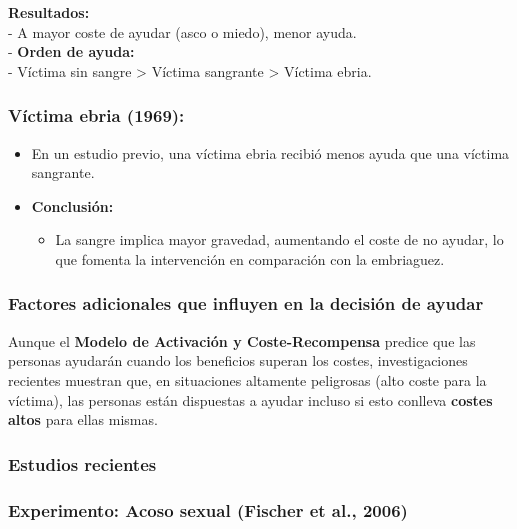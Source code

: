 \documentclass[
]{book}
\providecommand{\tightlist}{%
  \setlength{\itemsep}{0pt}\setlength{\parskip}{0pt}}
\begin{document}
\textbf{Resultados:}\\
- A mayor coste de ayudar (asco o miedo), menor ayuda.\\
- \textbf{Orden de ayuda:}\\
- Víctima sin sangre \textgreater{} Víctima sangrante \textgreater{} Víctima ebria.

\subsubsection{\texorpdfstring{\textbf{Víctima ebria (1969):}}{Víctima ebria (1969):}}\label{vuxedctima-ebria-1969}

\begin{itemize}
\tightlist
\item
  En un estudio previo, una víctima ebria recibió menos ayuda que una víctima sangrante.\\
\item
  \textbf{Conclusión:}

  \begin{itemize}
  \tightlist
  \item
    La sangre implica mayor gravedad, aumentando el coste de no ayudar, lo que fomenta la intervención en comparación con la embriaguez.
  \end{itemize}
\end{itemize}

\subsubsection{Factores adicionales que influyen en la decisión de ayudar}\label{factores-adicionales-que-influyen-en-la-decisiuxf3n-de-ayudar}

Aunque el \textbf{Modelo de Activación y Coste-Recompensa} predice que las personas ayudarán cuando los beneficios superan los costes, investigaciones recientes muestran que, en situaciones altamente peligrosas (alto coste para la víctima), las personas están dispuestas a ayudar incluso si esto conlleva \textbf{costes altos} para ellas mismas.

\subsubsection{\texorpdfstring{\textbf{Estudios recientes}}{Estudios recientes}}\label{estudios-recientes}

\subsubsection{\texorpdfstring{\textbf{Experimento: Acoso sexual (Fischer et al., 2006)}}{Experimento: Acoso sexual (Fischer et al., 2006)}}\label{experimento-acoso-sexual-fischer-et-al.-2006}
\end{document}
